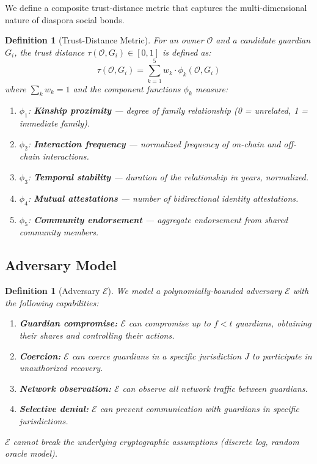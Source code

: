 \documentclass[11pt,a4paper,twocolumn]{article}
\newtheorem{definition}[theorem]{Definition}
\begin{document}
We define a composite trust-distance metric that captures the multi-dimensional nature of diaspora social bonds.

\begin{definition}[Trust-Distance Metric]\label{def:trust}
For an owner $\mathcal{O}$ and a candidate guardian $G_i$, the trust distance $\tau(\mathcal{O}, G_i) \in [0, 1]$ is defined as:
\begin{equation}\label{eq:trust}
  \tau(\mathcal{O}, G_i) = \sum_{k=1}^{5} w_k \cdot \phi_k(\mathcal{O}, G_i)
\end{equation}
where $\sum_{k} w_k = 1$ and the component functions $\phi_k$ measure:
\begin{enumerate}
  \item $\phi_1$: \textbf{Kinship proximity} --- degree of family relationship (0 = unrelated, 1 = immediate family).
  \item $\phi_2$: \textbf{Interaction frequency} --- normalized frequency of on-chain and off-chain interactions.
  \item $\phi_3$: \textbf{Temporal stability} --- duration of the relationship in years, normalized.
  \item $\phi_4$: \textbf{Mutual attestations} --- number of bidirectional identity attestations.
  \item $\phi_5$: \textbf{Community endorsement} --- aggregate endorsement from shared community members.
\end{enumerate}
\end{definition}

\subsection{Adversary Model}

\begin{definition}[Adversary $\mathcal{E}$]\label{def:adversary}
We model a polynomially-bounded adversary $\mathcal{E}$ with the following capabilities:
\begin{enumerate}
  \item \textbf{Guardian compromise:} $\mathcal{E}$ can compromise up to $f < t$ guardians, obtaining their shares and controlling their actions.
  \item \textbf{Coercion:} $\mathcal{E}$ can coerce guardians in a specific jurisdiction $J$ to participate in unauthorized recovery.
  \item \textbf{Network observation:} $\mathcal{E}$ can observe all network traffic between guardians.
  \item \textbf{Selective denial:} $\mathcal{E}$ can prevent communication with guardians in specific jurisdictions.
\end{enumerate}
$\mathcal{E}$ \emph{cannot} break the underlying cryptographic assumptions (discrete log, random oracle model).
\end{definition}
\end{document}
